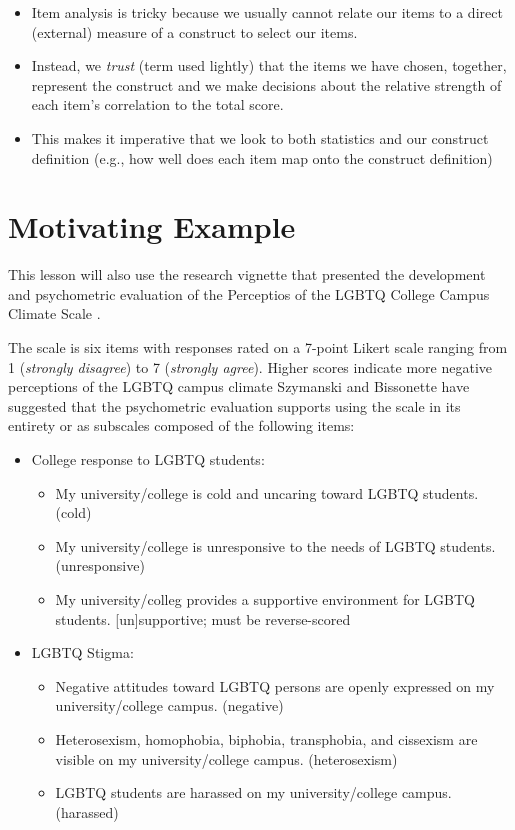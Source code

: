 \documentclass[
  english,
]{book}
\providecommand{\tightlist}{%
  \setlength{\itemsep}{0pt}\setlength{\parskip}{0pt}}
\begin{document}
\begin{itemize}
\tightlist
\item
  Item analysis is tricky because we usually cannot relate our items to a direct (external) measure of a construct to select our items.
\item
  Instead, we \emph{trust} (term used lightly) that the items we have chosen, together, represent the construct and we make decisions about the relative strength of each item's correlation to the total score.
\item
  This makes it imperative that we look to both statistics and our construct definition (e.g., how well does each item map onto the construct definition)
\end{itemize}

\hypertarget{motivating-example}{%
\section{Motivating Example}\label{motivating-example}}

This lesson will also use the research vignette that presented the development and psychometric evaluation of the Perceptios of the LGBTQ College Campus Climate Scale \citep{szymanski_perceptions_2020}.

The scale is six items with responses rated on a 7-point Likert scale ranging from 1 (\emph{strongly disagree}) to 7 (\emph{strongly agree}). Higher scores indicate more negative perceptions of the LGBTQ campus climate Szymanski and Bissonette have suggested that the psychometric evaluation supports using the scale in its entirety or as subscales composed of the following items:

\begin{itemize}
\tightlist
\item
  College response to LGBTQ students:

  \begin{itemize}
  \tightlist
  \item
    My university/college is cold and uncaring toward LGBTQ students. (cold)
  \item
    My university/college is unresponsive to the needs of LGBTQ students. (unresponsive)
  \item
    My university/colleg provides a supportive environment for LGBTQ students. {[}un{]}supportive; must be reverse-scored
  \end{itemize}
\item
  LGBTQ Stigma:

  \begin{itemize}
  \tightlist
  \item
    Negative attitudes toward LGBTQ persons are openly expressed on my university/college campus. (negative)
  \item
    Heterosexism, homophobia, biphobia, transphobia, and cissexism are visible on my university/college campus. (heterosexism)
  \item
    LGBTQ students are harassed on my university/college campus. (harassed)
  \end{itemize}
\end{itemize}
\end{document}
